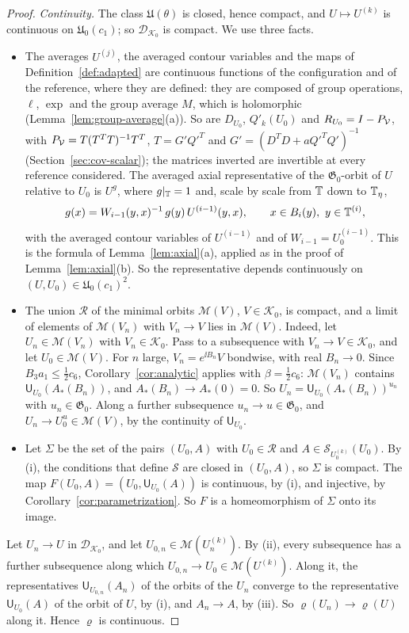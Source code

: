 \begin{proof}
\emph{Continuity.} The class $\mathfrak U(\theta)$ is closed, hence compact, and $U\mapsto U^{(k)}$ is continuous on $\mathfrak U_0(c_1)$; so $\mathcal D_{\mathcal K_0}$ is compact. We use three facts.
\begin{itemize}
\item[(i)] The averages $U^{(j)}$, the averaged contour variables and the maps of Definition~\ref{def:adapted} are continuous functions of the configuration and of the reference, where they are defined: they are composed of group operations, $\ell$, $\exp$ and the group average $M$, which is holomorphic (Lemma~\ref{lem:group-average}(a)). So are $D_{U_0}$, $Q'_k(U_0)$ and $R_{U_0}=I-P_\mathcal V$, with $P_\mathcal V=T(T^TT)^{-1}T^T$, $T=G'Q'^T$ and $G'=(D^TD+aQ'^TQ')^{-1}$ (Section~\ref{sec:cov-scalar}); the matrices inverted are invertible at every reference considered. The averaged axial representative of the $\mathfrak G_0$-orbit of $U$ relative to $U_0$ is $U^g$, where $g|_\mathbb T=1$ and, scale by scale from $\mathbb T$ down to $\mathbb T_\eta$,
\[
g(x)=W_{i-1}(y,x)^{-1}\,g(y)\,U^{(i-1)}(y,x),\qquad x\in B_i(y),\ y\in\mathbb T^{(i)},
\]
with the averaged contour variables of $U^{(i-1)}$ and of $W_{i-1}=U_0^{(i-1)}$. This is the formula of Lemma~\ref{lem:axial}(a), applied as in the proof of Lemma~\ref{lem:axial}(b). So the representative depends continuously on $(U,U_0)\in\mathfrak U_0(c_1)^2$.
\item[(ii)] The union $\mathcal R$ of the minimal orbits $\mathscr M(V)$, $V\in\mathcal K_0$, is compact, and a limit of elements of $\mathscr M(V_n)$ with $V_n\to V$ lies in $\mathscr M(V)$. Indeed, let $U_n\in\mathscr M(V_n)$ with $V_n\in\mathcal K_0$. Pass to a subsequence with $V_n\to V\in\mathcal K_0$, and let $U_0\in\mathscr M(V)$. For $n$ large, $V_n=e^{\ii B_n}V$ bondwise, with real $B_n\to0$. Since $B_3a_1\le\frac12c_6$, Corollary~\ref{cor:analytic} applies with $\beta=\frac12c_6$: $\mathscr M(V_n)$ contains $\mathsf U_{U_0}(A_*(B_n))$, and $A_*(B_n)\to A_*(0)=0$. So $U_n=\mathsf U_{U_0}(A_*(B_n))^{u_n}$ with $u_n\in\mathfrak G_0$. Along a further subsequence $u_n\to u\in\mathfrak G_0$, and $U_n\to U_0^u\in\mathscr M(V)$, by the continuity of $\mathsf U_{U_0}$.
\item[(iii)] Let $\Sigma$ be the set of the pairs $(U_0,A)$ with $U_0\in\mathcal R$ and $A\in\mathcal S_{U_0^{(k)}}(U_0)$. By (i), the conditions that define $\mathcal S$ are closed in $(U_0,A)$, so $\Sigma$ is compact. The map $F(U_0,A)=(U_0,\mathsf U_{U_0}(A))$ is continuous, by (i), and injective, by Corollary~\ref{cor:parametrization}. So $F$ is a homeomorphism of $\Sigma$ onto its image.
\end{itemize}
Let $U_n\to U$ in $\mathcal D_{\mathcal K_0}$, and let $U_{0,n}\in\mathscr M(U_n^{(k)})$. By (ii), every subsequence has a further subsequence along which $U_{0,n}\to U_0\in\mathscr M(U^{(k)})$. Along it, the representatives $\mathsf U_{U_{0,n}}(A_n)$ of the orbits of the $U_n$ converge to the representative $\mathsf U_{U_0}(A)$ of the orbit of $U$, by (i), and $A_n\to A$, by (iii). So $\varrho(U_n)\to\varrho(U)$ along it. Hence $\varrho$ is continuous.


\end{proof}
